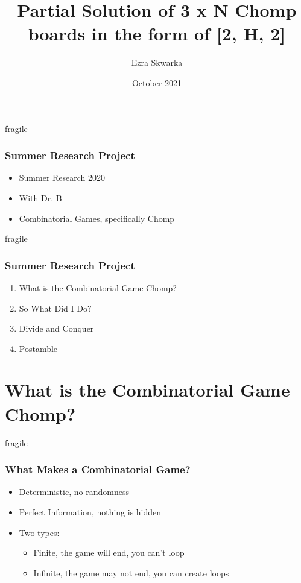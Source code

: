 \documentclass[aspectratio=169,usenames,dvipsnames]{beamer}
\title{Partial Solution of 3 x N Chomp boards in the form of [2, H, 2]}
\author[E. Skwarka]{Ezra Skwarka}
\date[2021]{October 2021}
\begin{document}
\titleslide

\begin{frame}{fragile}
    \frametitle{Summer Research Project}

    \begin{itemize}
        \item Summer Research 2020
        \item With Dr. B
        \item Combinatorial Games, specifically Chomp
    \end{itemize}
\end{frame} 

\begin{frame}{fragile}
    \frametitle{Summer Research Project}

    \begin{enumerate}
        \item What is the Combinatorial Game Chomp?
        \item So What Did I Do?
        \item Divide and Conquer
        \item Postamble
    \end{enumerate}
\end{frame} 


\section{What is the Combinatorial Game Chomp?}

\begin{frame}{fragile}
    \frametitle{What Makes a Combinatorial Game?}

    \begin{itemize}
        \item Deterministic, no randomness
        \item Perfect Information, nothing is hidden
    \end{itemize}
    \text{$  $}
    \begin{itemize}
        \item Two types:
            \begin{itemize}
            \item Finite, the game will end, you can't loop
            \item Infinite, the game may not end, you can create loops
            \end{itemize}
    \end{itemize}
\end{frame} 
\end{document}
